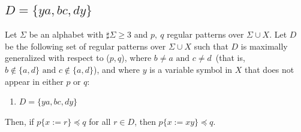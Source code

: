
\subsection{$D = \{ ya, bc, dy \}$}\label{subsec:d3a}

\newcommand{\TheConditionA}{$b \not\in \{a,d\} \mbox{~and~} c \not\in \{a,d\}$}
\newcommand{\TheConditionAprime}{{\color{red}$b \neq a \mbox{~and~} c \neq d$}}
\newcommand{\TheConditionB}{$b = a,~b \not= d, \mbox{~and~} c \not\in \{a,d\}$}
\newcommand{\TheConditionBsub}{$c \not\in \{a,d\}$}
\newcommand{\TheConditionC}{$b \not\in \{a, d\},~c \not= a, \mbox{~and~} c = d$}

\begin{lem}\label{lem:addpart}
  Let $\Sigma$ be an alphabet with $\sharp\Sigma \ge 3$ and $p,~q$ regular patterns {\color{red}over} $\Sigma\cup X$.
  Let $D$ be the following set of regular patterns {\color{red}over} $\Sigma\cup X$
  {\color{red} such that $D$ is maximally generalized {\color{red}with respect to} ($p,q$), where \TheConditionAprime~(that is, \TheConditionA),
  and }
  where $y$ is a variable symbol in $X$ that does not appear in {\color{red}either }$p$ {\color{red}or} $q$:
  \begin{enumerate}
  \item[] $D = \{ ya, bc, dy \}$
  \end{enumerate}
  Then, {\color{red} if $p \{ x := r \} \preceq q$ for all $r \in D$,} then $p \{ x := xy \} \preceq q$.
\end{lem}

